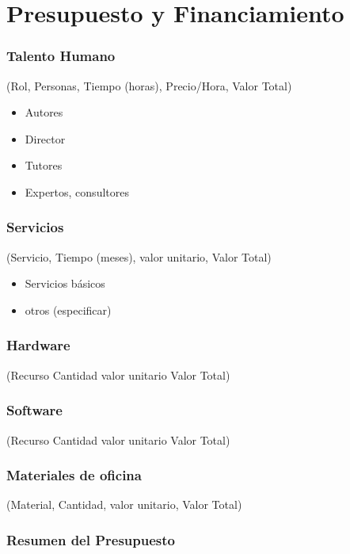 \chapter{Presupuesto y Financiamiento}

\subsection{Talento Humano}
(Rol, Personas, Tiempo (horas), Precio/Hora, Valor Total)
    \begin{itemize}
        \item Autores
        \item Director
        \item Tutores
        \item Expertos, consultores
    \end{itemize}

\subsection{Servicios}
(Servicio, Tiempo (meses), valor unitario, Valor Total)

\begin{itemize}
    \item Servicios básicos
    \item otros (especificar)
\end{itemize}

\subsection{Hardware}
(Recurso Cantidad valor unitario Valor Total)

\subsection{Software}
(Recurso Cantidad valor unitario Valor Total)

\subsection{Materiales de oficina}
(Material, Cantidad, valor unitario, Valor Total)


\subsection{Resumen del Presupuesto}


\label{Presupuesto}